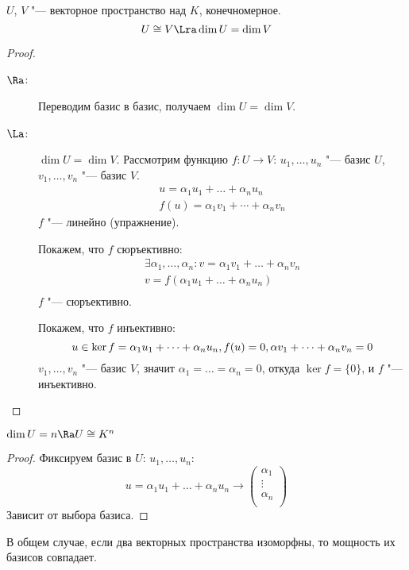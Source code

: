 \begin{conseq}
	$U$, $V$ "--- векторное пространство над $K$, конечномерное.
	\[ U \cong V \Lra \dim U = \dim V \]
\end{conseq}
\begin{proof}
	\begin{description}
	\item[$\Ra$:]
		Переводим базис в базис, получаем $\dim U = \dim V$.

	\item[$\La$:]
		$\dim U = \dim V$.
		Рассмотрим функцию $f: U \to V$:
		$u_1, \dots, u_n$ "--- базис $U$, $v_1, \dots, v_n$ "--- базис $V$.
		\begin{gather*}
			u = \alpha_1u_1 + \dots + \alpha_nu_n \\
			f(u) = \alpha_1 v_1 + \cdots + \alpha_n v_n
		\end{gather*}
		$f$ "--- линейно (упражнение).

		Покажем, что $f$ сюръективно:
		\begin{gather*}
			\exists \alpha_1, \dots, \alpha_n\colon v = \alpha_1 v_1 + \dots + \alpha_n v_n \\
			v = f(\alpha_1 u_1 + \dots + \alpha_n u_n) \\
		\end{gather*}
		$f$ "--- сюръективно.

		Покажем, что $f$ инъективно:
		\[
			u \in \ker f = \alpha_1 u_1 + \cdots + \alpha_nu_n, f(u) = 0,
				\alpha v_1 + \cdots + \alpha_nv_n = 0 \\
		\]
		$v_1, \dots, v_n$ "--- базис $V$, значит $\alpha_1 = \dots = \alpha_n = 0$, откуда
		$\ker f = \{0\}$, и $f$ "--- инъективно.
	\end{description}
\end{proof}

\begin{conseq}
	$\dim U = n \Ra U \cong K^n$
\end{conseq}
\begin{proof}
	Фиксируем базис в $U$: $u_1, \dots, u_n$:
	\[
		u = \alpha_1 u_1 + \dots + \alpha_n u_n \to
		\begin{pmatrix}
			\alpha_1 \\
			\vdots \\
			\alpha_n \\
		\end{pmatrix}
	\]
	Зависит от выбора базиса.
\end{proof}

\begin{Rem}
	В общем случае, если два векторных пространства изоморфны, то мощность их базисов совпадает.
\end{Rem}

